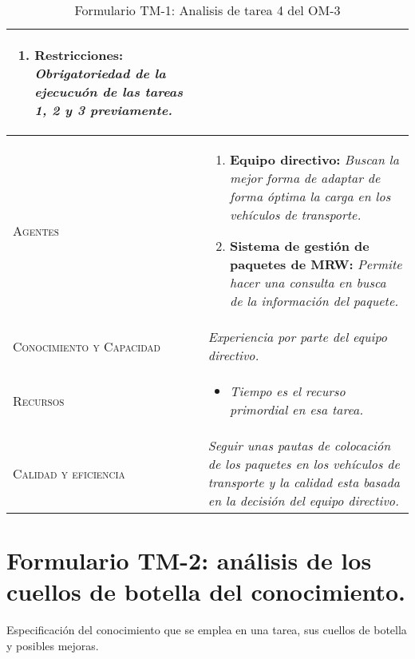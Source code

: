 \begin{table}[H]
{\begin{tabularx}{\textwidth}{|l|X|}
\begin{enumerate}
					\item \textbf{Restricciones:} \textit{Obrigatoriedad de la ejecucuón de las tareas 1, 2 y 3 previamente.}
				\end{enumerate} \\
			\hline
			\textsc{Agentes} & 
				\begin{enumerate}
					\item \textbf{Equipo directivo:} \textit{Buscan la mejor forma de adaptar de forma óptima la carga en los vehículos de transporte.}
					\item \textbf{Sistema de gestión de paquetes de MRW:} \textit{Permite hacer una consulta en busca de la información del paquete.}
				\end{enumerate} \\
			\hline
			\textsc{Conocimiento y Capacidad} & \textit{Experiencia por parte del equipo directivo.} \\
			\hline
			\textsc{Recursos} & 
				\begin{itemize}
					\item \textit{Tiempo es el recurso primordial en esa tarea.}
				\end{itemize} \\
			\hline
			\textsc{Calidad y eficiencia} & \textit{Seguir unas pautas de colocación de los paquetes en los vehículos de transporte y la calidad esta basada en la decisión del equipo directivo.} \\
			\hline
		\end{tabularx}
	}
	\caption{\label{tab:TM1T4}Formulario TM-1: Analisis de tarea 4 del OM-3}
\end{table} 
\newpage

\section{Formulario TM-2: análisis de los cuellos de botella del conocimiento.}
Especificación del conocimiento que se emplea en una tarea, sus cuellos de botella y posibles mejoras.

